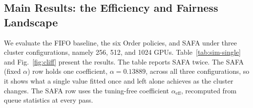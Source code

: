 \documentclass{ieeetj}
\begin{document}
\subsection{Main Results: the Efficiency and Fairness Landscape}\label{eval:main}
We evaluate the FIFO baseline, the six Order policies, and SAFA under three cluster configurations, namely 256, 512, and 1024 GPUs. Table~\ref{tab:sim-single} and Fig.~\ref{fig:cliff} present the results. The table reports SAFA twice. The SAFA (fixed $\alpha$) row holds one coefficient, $\alpha=0.13889$, across all three configurations, so it shows what a single value fitted once and left alone achieves as the cluster changes. The SAFA row uses the tuning-free coefficient $\alpha_{\text{eff}}$, recomputed from queue statistics at every pass.

\begin{table}[htb!]
\centering
\caption{Main results: order fairness (Fairness and Overtaken), queueing delay, resource utilization, and distributional fairness (Gini and TailRatio)}
\scriptsize
\setlength{\tabcolsep}{2.5pt}
\end{table}
\end{document}

